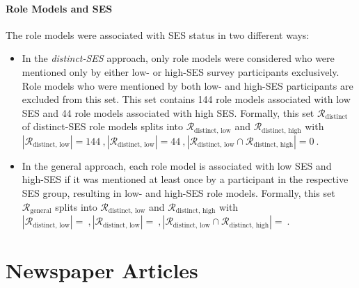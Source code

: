 \paragraph{Role Models and SES}
The role models were associated with SES status in two different ways:
\begin{itemize}
    \item In the \textit{distinct-SES} approach, only role models were considered who were mentioned only by either low- or high-SES survey participants exclusively. Role models who were mentioned by both low- and high-SES participants are excluded from this set. This set contains \SI{144}{} role models associated with low SES and \SI{44}{} role models associated with high SES. Formally, this set $\mathcal{R}_\text{distinct}$ of distinct-SES role models splits into $\mathcal{R}_\text{distinct, low}$ and $\mathcal{R}_\text{distinct, high}$ with $\left|\mathcal{R}_\text{distinct, low}\right| = \SI{144}{}, \left|\mathcal{R}_\text{distinct, low}\right| = \SI{44}{}, \left|\mathcal{R}_\text{distinct, low} \cap \mathcal{R}_\text{distinct, high}\right| = \SI{0}{}$.
    
    \item In the general approach, each role model is associated with low SES and high-SES if it was mentioned at least once by a participant in the respective SES group, resulting in \SI{}{} low- and \SI{}{} high-SES role models. Formally, this set $\mathcal{R}_\text{general}$ splits into $\mathcal{R}_\text{distinct, low}$ and $\mathcal{R}_\text{distinct, high}$ with $\left|\mathcal{R}_\text{distinct, low}\right| = \SI{}{}, \left|\mathcal{R}_\text{distinct, low}\right| = \SI{}{}, \left|\mathcal{R}_\text{distinct, low} \cap \mathcal{R}_\text{distinct, high}\right| = \SI{}{}$.
\end{itemize}


\section{Newspaper Articles}